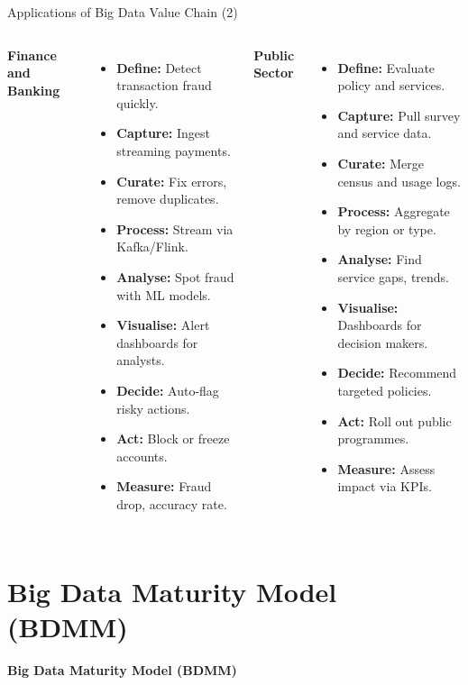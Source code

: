 \documentclass[aspectratio=169, table]{beamer}
\begin{document}
	\begin{frame}[fragile]{Applications of Big Data Value Chain (2)}
		\vspace{20pt}
		\small
		\begin{columns}[t]
			\textbf{Finance and Banking}
			\begin{itemize}
				\item \textbf{Define:} Detect transaction fraud quickly.
				\item \textbf{Capture:} Ingest streaming payments.
				\item \textbf{Curate:} Fix errors, remove duplicates.
				\item \textbf{Process:} Stream via Kafka/Flink.
				\item \textbf{Analyse:} Spot fraud with ML models.
				\item \textbf{Visualise:} Alert dashboards for analysts.
				\item \textbf{Decide:} Auto-flag risky actions.
				\item \textbf{Act:} Block or freeze accounts.
				\item \textbf{Measure:} Fraud drop, accuracy rate.
			\end{itemize}
			
			\textbf{Public Sector}
			\begin{itemize}
				\item \textbf{Define:} Evaluate policy and services.
				\item \textbf{Capture:} Pull survey and service data.
				\item \textbf{Curate:} Merge census and usage logs.
				\item \textbf{Process:} Aggregate by region or type.
				\item \textbf{Analyse:} Find service gaps, trends.
				\item \textbf{Visualise:} Dashboards for decision makers.
				\item \textbf{Decide:} Recommend targeted policies.
				\item \textbf{Act:} Roll out public programmes.
				\item \textbf{Measure:} Assess impact via KPIs.
			\end{itemize}
		\end{columns}
	\end{frame}
	
	\section{Big Data Maturity Model (BDMM)}
	\begin{frame}{\hfill}
		\centering
		\Huge{\textbf{Big Data Maturity Model (BDMM)}}
	\end{frame}
\end{document}

